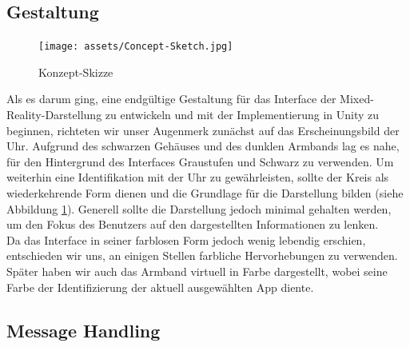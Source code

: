 \documentclass[11pt, a4paper]{article}
\begin{document}
\newpage

\subsection{Gestaltung}

\begin{figure}
    \centering
	\texttt{[image: assets/Concept-Sketch.jpg]}
	\caption{Konzept-Skizze}
	\label{fig:early_sketch_of_visualization}
\end{figure}

Als es darum ging, eine endgültige Gestaltung für das Interface der Mixed-Reality-Darstellung zu entwickeln und mit der Implementierung in Unity zu beginnen, richteten wir unser Augenmerk zunächst auf das Erscheinungsbild der Uhr. Aufgrund des schwarzen Gehäuses und des dunklen Armbands lag es nahe, für den Hintergrund des Interfaces Graustufen und Schwarz zu verwenden. Um weiterhin eine Identifikation mit der Uhr zu gewährleisten, sollte der Kreis als wiederkehrende Form dienen und die Grundlage für die Darstellung bilden (siehe Abbildung \ref{fig:early_sketch_of_visualization}). Generell sollte die Darstellung jedoch minimal gehalten werden, um den Fokus des Benutzers auf den dargestellten Informationen zu lenken.\\
Da das Interface in seiner farblosen Form jedoch wenig lebendig erschien, entschieden wir uns, an einigen Stellen farbliche Hervorhebungen zu verwenden. Später haben wir auch das Armband virtuell in Farbe dargestellt, wobei seine Farbe der Identifizierung der aktuell ausgewählten App diente.

\subsection{Message Handling}
\end{document}

